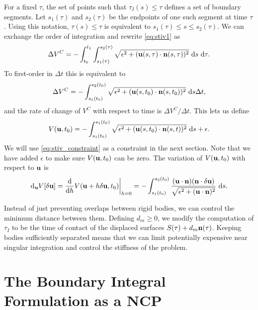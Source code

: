 For a fixed $\tau$, the set of points such that $\tau_I(s)\leq \tau$ defines a set of boundary segments. Let $s_1(\tau)$ and $s_2(\tau)$ be the endpoints of one such segment at time $\tau$.  Using this notation, $\tau(s)\leq \tau$ is equivalent to $s_1(\tau)\leq s \leq s_2(\tau)$. We can exchange the order of integration and rewrite \eqref{eq:stiv1} as
\[ \Delta V^C = -\int_{t_0}^{t_1} \int_{s_1(\tau)}^{s_2(\tau)} \sqrt{\epsilon^2 + ({\mathbf{u}}(s,\tau)\cdot{\mathbf{n}}(s,\tau))^2}~\text{d}s~\text{d}\tau.\]
To first-order in $\Delta t$ this is equivalent to
\[ \Delta V^C =  -\int_{s_1(t_0)}^{s_2(t_0)} \sqrt{\epsilon^2 + ({\mathbf{u}}(s,t_0)\cdot{\mathbf{n}}(s,t_0))^2}~\text{d}s\Delta t,\]
and the rate of change of $V^C$ with respect to time is $\Delta V^C/\Delta t$. This lets us define
\begin{equation}\label{eq:stiv_constraint} V({\mathbf{u}}, t_0) = -\int_{s_1(t_0)}^{s_1(t_0)} \sqrt{\epsilon^2 + ({\mathbf{u}}(s,t_0)\cdot{\mathbf{n}}(s,t))^2}~\text{d}s + \epsilon.\end{equation}
We will use \eqref{eq:stiv_constraint} as a constraint in the next section. Note that we have added $\epsilon$ to make sure $V({\mathbf{u}},t_0)$ can be zero. The variation of $V({\mathbf{u}},t_0)$ with respect to ${\mathbf{u}}$ is
\begin{equation}\label{eq:stiv_variation} \text{d}_{{\mathbf{u}}}V[\delta{\mathbf{u}}] = \frac{\text{d}}{\text{d}h}  V({\mathbf{u}} + h \delta{\mathbf{u}},t_0)\bigg\rvert_{h=0} = -\int_{s_1(t_0)}^{s_2(t_0)} \dfrac{({\mathbf{u}}\cdot{\mathbf{n}})({\mathbf{n}}\cdot\delta {\mathbf{u}})}{\sqrt{\epsilon^2 + ({\mathbf{u}}\cdot{\mathbf{n}})^2}}~\text{d}s.\end{equation}

Instead of just preventing overlaps between rigid bodies, we can control the minimum distance between them. Defining $d_m\geq 0$, we modify the computation of $\tau_I$ to  be the time of contact of the displaced surfaces $S(\tau) + d_m{\mathbf{n}}(\tau)$. Keeping bodies sufficiently separated means that we can limit potentially expensive near singular integration and control the stiffness of the problem.



\section{The Boundary Integral Formulation as a NCP}

